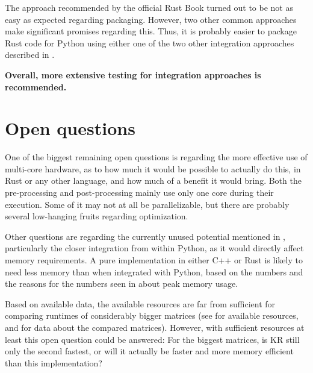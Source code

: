 The approach recommended by the official Rust Book turned out to be not as easy
as expected regarding packaging. However, two other common approaches make
significant promises regarding this. Thus, it is probably easier to package
Rust code for Python using either one of the two other integration approaches
described in .

\textbf{Overall, more extensive testing for integration approaches is recommended.}


\section{Open questions}

One of the biggest remaining open questions is regarding the more effective use
of multi-core hardware, as to how much it would be possible to actually do
this, in Rust or any other language, and how much of a benefit it would bring.
Both the pre-processing and post-processing mainly use only one core during
their execution. Some of it may not at all be parallelizable, but there are
probably several low-hanging fruits regarding optimization.

Other questions are regarding the currently unused potential mentioned in
, particularly the closer integration from within Python,
as it would directly affect memory requirements. A pure implementation in
either C++ or Rust is likely to need less memory than when integrated with
Python, based on the numbers and the reasons for the numbers seen in
 about peak memory usage.

Based on available data, the available resources are far from sufficient for
comparing runtimes of considerably bigger matrices (see  for
available resources, and  for data about the compared
matrices).
However, with sufficient resources at least this open question could be
answered: For the biggest matrices, is KR still only the second fastest, or
will it actually be faster and more memory efficient than this implementation?











% 
% 
% 
% 







